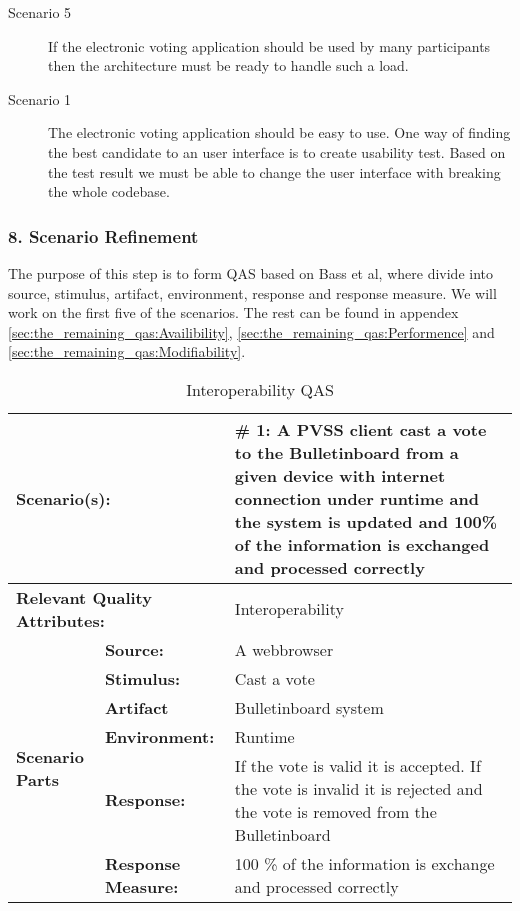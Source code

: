 \begin{description}
     \item [Scenario 5]
        If the electronic voting application should be used by many participants then the architecture must be ready to handle such a load. 
        
    \item [Scenario 1]
        The electronic voting application should be easy to use. One way of finding the best candidate to an user interface is to create usability test. Based on the test result we must be able to change the user interface with breaking the whole codebase. 
  \end{description}


\subsubsection{8. Scenario Refinement}
The purpose of this step is to form QAS based on Bass et al, where divide into source, stimulus, artifact, environment, response and response measure. We will work on the first five of the scenarios. The rest can be found in appendex \ref{sec:the_remaining_qas:Availibility}, \ref{sec:the_remaining_qas:Performence} and \ref{sec:the_remaining_qas:Modifiability}.


\begin{table}[H]
\begin{center}
\begin{tabular}{|p{0.3cm}|p{2.5cm}|p{8cm}|}
  \hline
  \multicolumn{2}{|p{3cm}|}{\bfseries Scenario(s):} & \#  1: A PVSS client cast a vote to the Bulletinboard from a given device with internet connection  under runtime and the system is updated and 100\% of the information is exchanged  and processed correctly\\
  \hline
  \multicolumn{2}{|p{3cm}|}{\bfseries Relevant Quality Attributes:} & Interoperability\\
  \hline
  \multirow{6}{*}{\begin{sideways}{\bfseries Scenario Parts}\end{sideways}}
  & {\bfseries Source:} & A webbrowser \\
  \cline{2-3}
  & {\bfseries Stimulus:} & Cast a vote \\
  \cline{2-3}
  & {\bfseries Artifact} &  Bulletinboard system \\
  \cline{2-3}
  & {\bfseries Environment:} &  Runtime \\
  \cline{2-3}
  & {\bfseries Response:} &  If the vote is valid it is accepted. If the vote is invalid it is rejected and the vote is removed from the Bulletinboard \\
  \cline{2-3}
  & {\bfseries Response Measure:} & 100 \% of the information is exchange and processed correctly \\
  \hline
\end{tabular}
\caption{Interoperability QAS}
\end{center}
\end{table}


